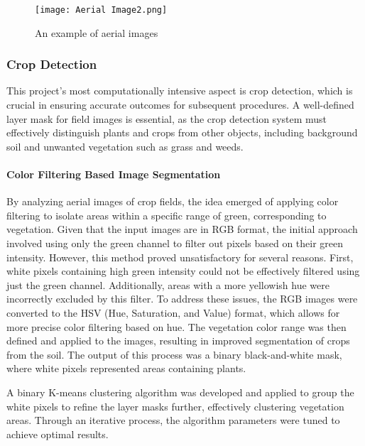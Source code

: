 \documentclass[conference]{IEEEtran}
\begin{document}
\begin{figure}[htbp]
\texttt{[image: Aerial Image2.png]}
\caption{An example of aerial images}
\label{fig1}
\end{figure}

\subsubsection{Crop Detection}
This project's most computationally intensive aspect is crop detection, which is crucial in ensuring accurate outcomes for subsequent procedures. A well-defined layer mask for field images is essential, as the crop detection system must effectively distinguish plants and crops from other objects, including background soil and unwanted vegetation such as grass and weeds. 

\paragraph{Color Filtering Based Image Segmentation}
By analyzing aerial images of crop fields, the idea emerged of applying color filtering to isolate areas within a specific range of green, corresponding to vegetation. Given that the input images are in RGB format, the initial approach involved using only the green channel to filter out pixels based on their green intensity. However, this method proved unsatisfactory for several reasons. First, white pixels containing high green intensity could not be effectively filtered using just the green channel. Additionally, areas with a more yellowish hue were incorrectly excluded by this filter. To address these issues, the RGB images were converted to the HSV (Hue, Saturation, and Value) format, which allows for more precise color filtering based on hue. The vegetation color range was then defined and applied to the images, resulting in improved segmentation of crops from the soil. The output of this process was a binary black-and-white mask, where white pixels represented areas containing plants.

A binary K-means clustering algorithm was developed and applied to group the white pixels to refine the layer masks further, effectively clustering vegetation areas. Through an iterative process, the algorithm parameters were tuned to achieve optimal results.
\end{document}
